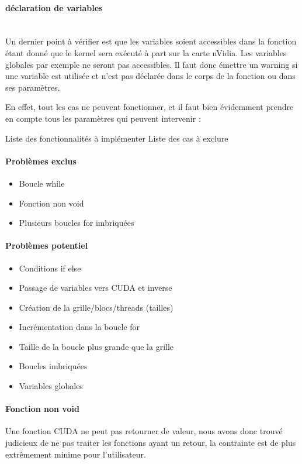 \documentclass{article}
\begin{document}
	\paragraph{déclaration de variables}
	~~\\
	\indent
	Un dernier point à vérifier est que les variables soient accessibles dans la fonction étant donné que le kernel sera exécuté à part sur la carte nVidia. Les variables globales par exemple ne seront pas accessibles. Il faut donc émettre un warning si une variable est utilisée et n'est pas déclarée dans le corps de la fonction ou dans ses paramètres.
	
	En effet, tout les cas ne peuvent fonctionner, et il faut bien évidemment prendre en compte tous les paramètres qui peuvent intervenir :

	Liste des fonctionnalités à implémenter
	Liste des cas à exclure
	\paragraph{Problèmes exclus}
	\begin{itemize}
  		\item Boucle while
  		\item Fonction non void
  		\item Plusieurs boucles for imbriquées	
	\end{itemize}
	
	\paragraph{Problèmes potentiel}
		\begin{itemize}
  		\item Conditions if else
  		\item Passage de variables vers CUDA et inverse
  		\item Création de la grille/blocs/threads (tailles)
  		\item Incrémentation dans la boucle for
  		\item Taille de la boucle plus grande que la grille
  		\item Boucles imbriquées
  		\item Variables globales
	\end{itemize}
	\paragraph{Fonction non void}
	Une fonction CUDA ne peut pas retourner de valeur, nous avons donc trouvé judicieux de ne pas traiter les fonctions ayant un retour, la contrainte est de plus extrêmement minime pour l'utilisateur.
	
\end{document}
